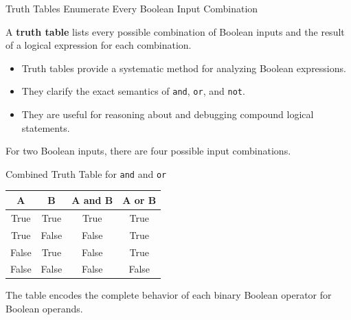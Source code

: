 \documentclass[aspectratio=169,10pt]{beamer}
\begin{document}

\begin{frame}{Truth Tables Enumerate Every Boolean Input Combination}
  \begin{cpdefinition}
    A \textbf{truth table} lists every possible combination of Boolean inputs and the result of a logical expression for each combination.
  \end{cpdefinition}

  \begin{itemize}
    \item Truth tables provide a systematic method for analyzing Boolean expressions.
    \item They clarify the exact semantics of \texttt{and}, \texttt{or}, and \texttt{not}.
    \item They are useful for reasoning about and debugging compound logical statements.
  \end{itemize}

  \begin{keyidea}
    For two Boolean inputs, there are four possible input combinations.
  \end{keyidea}
\end{frame}

\begin{frame}{Combined Truth Table for \texttt{and} and \texttt{or}}
  \begin{center}
    \renewcommand{\arraystretch}{1.45}
    \begin{tabular}{c|c|c|c}
      \textbf{A} & \textbf{B} & \textbf{A and B} & \textbf{A or B} \\\hline
      True & True & True & True \\
      True & False & False & True \\
      False & True & False & True \\
      False & False & False & False
    \end{tabular}
  \end{center}

  \begin{keyidea}
    The table encodes the complete behavior of each binary Boolean operator for Boolean operands.
  \end{keyidea}
\end{frame}
\end{document}
